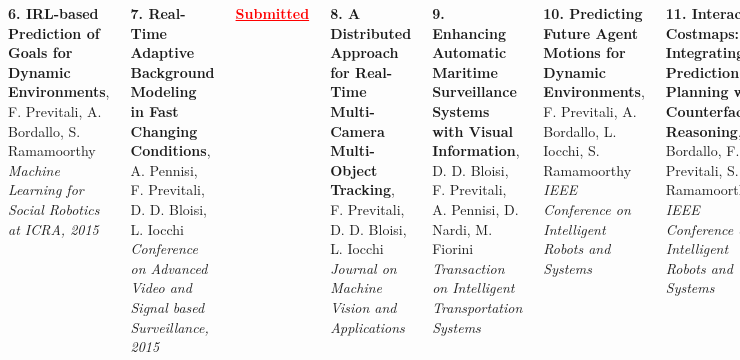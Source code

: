 \begin{frame}
\begin{columns}[t]
		\vspace{0.15cm}
		
		\textbf{6. IRL-based Prediction of Goals for Dynamic Environments}, F. Previtali, A. Bordallo,
		S. Ramamoorthy \\
		\emph{Machine Learning for Social Robotics at ICRA, 2015}
		
		
		\vspace{0.34cm}
		
		\tiny
		
		\textbf{7. Real-Time Adaptive Background Modeling in Fast Changing Conditions}, A. Pennisi, F.
		Previtali, D. D. Bloisi, L. Iocchi \\
		\emph{Conference on Advanced Video and Signal based Surveillance, 2015}
		
		\vspace{0.2cm}
		
		\textcolor{red}{\textbf{\underline{Submitted}}}
		
		\vspace{0.1cm}
		
		\textbf{8. A Distributed Approach for Real-Time Multi-Camera Multi-Object Tracking}, F.
		Previtali, D. D. Bloisi, L. Iocchi \\
		\emph{Journal on Machine Vision and Applications}
		
		\vspace{0.15cm}
		
		\textbf{9. Enhancing Automatic Maritime Surveillance Systems with Visual Information}, D. D.
		Bloisi, F. Previtali, A. Pennisi, D. Nardi, M. Fiorini \\
		\emph{Transaction on Intelligent Transportation Systems}
		
		\vspace{0.15cm}
		
		\textbf{10. Predicting Future Agent Motions for Dynamic Environments}, F. Previtali, A.
		Bordallo, L. Iocchi, S. Ramamoorthy \\
		\emph{IEEE Conference on Intelligent Robots and Systems}
		
		\vspace{0.15cm}
		
		\textbf{11. Interactive Costmaps: Integrating Prediction and Planning with Counterfactual
		Reasoning}, A. Bordallo, F. Previtali, S. Ramamoorthy \\
		\emph{IEEE Conference on Intelligent Robots and Systems}
	\end{columns}
\end{frame}

